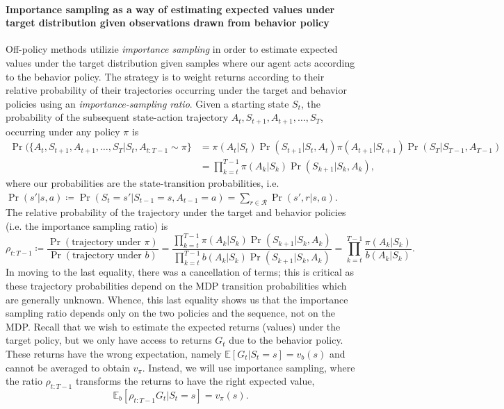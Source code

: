 \documentclass[12pt]{article}
\begin{document}
\paragraph{Importance sampling as a way of estimating expected values under target distribution given observations drawn from behavior policy} Off-policy methods utilizie \emph{importance sampling} in order to estimate expected values under the target distribution given samples where our agent acts according to the behavior policy. The strategy is to weight returns according to their relative probability of their trajectories occurring under the target and behavior policies using an \emph{importance-sampling ratio}. Given a starting state $S_t$, the probability of the subsequent state-action trajectory $A_t, S_{t+1}, A_{t+1}, \ldots, S_T$, occurring under any policy $\pi$ is
\begin{align*}
  \Pr(\{A_t, S_{t+1}, A_{t+1}, \ldots, S_T | S_t, A_{t:T-1} \sim \pi\} &= \pi(A_t|S_t) \Pr(S_{t+1} | S_t, A_t) \pi(A_{t+1} | S_{t+1}) \Pr(S_T | S_{T-1},                                                                          A_{T-1}) \\
  &= \prod_{k=t}^{T-1} \pi(A_k | S_k) \Pr(S_{k+1} | S_k , A_k),
\end{align*}
where our probabilities are the state-transition probabilities, i.e. $\Pr(s' | s, a) \coloneqq \Pr(S_t = s' | S_{t-1} = s, A_{t-1} = a) = \sum_{r \in \mathcal R} \Pr(s', r | s, a)$. The relative probability of the trajectory under the target and behavior policies (i.e. the importance sampling ratio) is
\[
  \rho_{t:T-1} \coloneqq \frac{\Pr(\textrm{trajectory under } \pi)}{\Pr(\textrm{trajectory under } b)} = \frac{\prod_{k=t}^{T-1} \pi(A_k |S_k) \Pr(S_{k+1} | S_k, A_k)}{\prod_{k=t}^{T-1} b(A_k|S_k) \Pr(S_{k+1} | S_k, A_k)} = \prod_{k=t}^{T-1} \frac{\pi(A_k|S_k)}{b(A_k | S_k)}.
\]
In moving to the last equality, there was a cancellation of terms; this is critical as these trajectory probabilities depend on the MDP transition probabilities which are generally unknown. Whence, this last equality shows us that the importance sampling ratio depends only on the two policies and the sequence, not on the MDP. Recall that we wish to estimate the expected returns (values) under the target policy, but we only have access to returns $G_t$ due to the behavior policy. These returns have the wrong expectation, namely $\mathbb E \left[ G_t | S_t = s \right] = v_b(s)$ and cannot be averaged to obtain $v_\pi$. Instead, we will use importance sampling, where the ratio $\rho_{t:T-1}$ transforms the returns to have the right expected value,
\begin{equation}
  \mathbb E_b \left[ \rho_{t:T-1} G_t | S_t = s \right] = v_\pi(s).
\end{equation}
\end{document}
